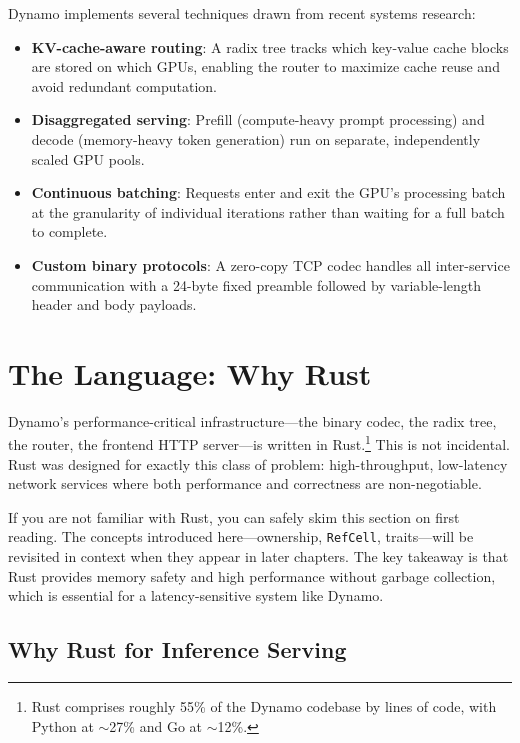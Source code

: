 Dynamo implements several techniques drawn from recent systems research:
\begin{itemize}
  \item \textbf{KV-cache-aware routing}: A radix tree tracks which key-value cache blocks are stored on which GPUs, enabling the router to maximize cache reuse and avoid redundant computation.
  \item \textbf{Disaggregated serving}: Prefill (compute-heavy prompt processing) and decode (memory-heavy token generation) run on separate, independently scaled GPU pools.
  \item \textbf{Continuous batching}: Requests enter and exit the GPU's processing batch at the granularity of individual iterations rather than waiting for a full batch to complete.
  \item \textbf{Custom binary protocols}: A zero-copy TCP codec handles all inter-service communication with a 24-byte fixed preamble followed by variable-length header and body payloads.
\end{itemize}

\section{The Language: Why Rust}

Dynamo's performance-critical infrastructure---the binary codec, the radix tree, the router, the frontend HTTP server---is written in Rust.\footnote{Rust comprises roughly 55\% of the Dynamo codebase by lines of code, with Python at $\sim$27\% and Go at $\sim$12\%.} This is not incidental. Rust was designed for exactly this class of problem: high-throughput, low-latency network services where both performance and correctness are non-negotiable.

\begin{notebox}
If you are not familiar with Rust, you can safely skim this section on first reading. The concepts introduced here---ownership, \texttt{RefCell}, traits---will be revisited in context when they appear in later chapters. The key takeaway is that Rust provides memory safety and high performance without garbage collection, which is essential for a latency-sensitive system like Dynamo.
\end{notebox}

\subsection{Why Rust for Inference Serving}

